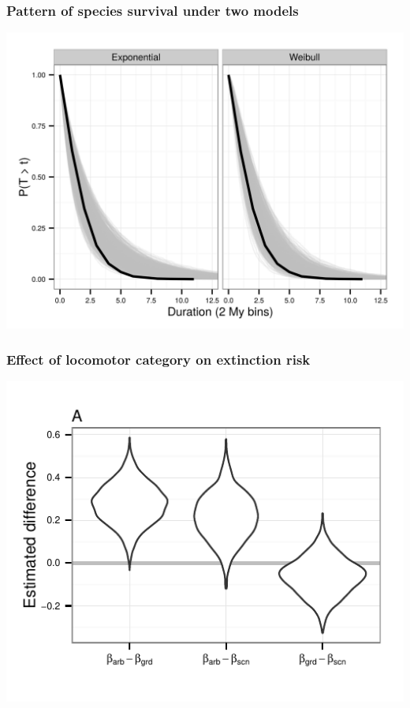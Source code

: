 \documentclass{beamer}
\begin{document}
\begin{frame}
  \frametitle{Pattern of species survival under two models}

  \begin{center}
    \includegraphics[height=0.75\textheight,keepaspectratio=true]{figure/survival_function_pres}
  \end{center}

  \footnotesize{}
\end{frame}

\begin{frame}
  \frametitle{Effect of locomotor category on extinction risk}

  \begin{center}
    \includegraphics[height=0.75\textheight,keepaspectratio=true]{figure/loco_diff_est}
  \end{center}

  \footnotesize{}
\end{frame}
\end{document}
